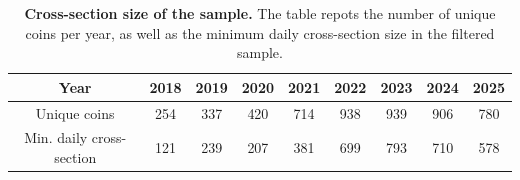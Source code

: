 \documentclass[
  12pt,
  a4paper,
  openany]{scrbook}
\begin{document}
\begin{table}[t]
\footnotesize
\centering
\caption[Cross-section size of the sample]{\textbf{Cross-section size of the sample.} The table repots the number of unique coins per year, as well as the minimum daily cross-section size in the filtered sample.}
\label{tbl-cross_section}
\vspace{5pt} %
\begin{tabular}{ccccccccc}
\toprule
Year & 2018 & 2019 & 2020 & 2021 & 2022 & 2023 & 2024 & 2025 \\
\midrule
Unique coins & 254 & 337 & 420 & 714 & 938 & 939 & 906 & 780 \\
Min. daily cross-section & 121 & 239 & 207 & 381 & 699 & 793 & 710 & 578 \\
\bottomrule
\end{tabular}
\end{table}
\end{document}
